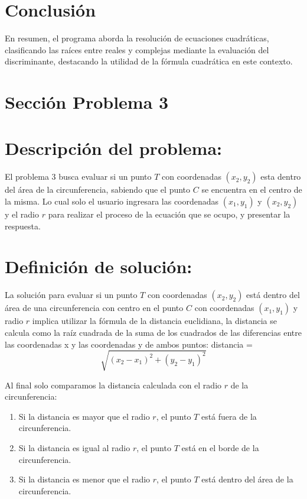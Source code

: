 \documentclass{IEEEcsmag}
\begin{document}
\section*{Conclusión}
En resumen, el programa aborda la resolución de ecuaciones cuadráticas, clasificando las raíces entre reales y complejas mediante la evaluación del discriminante, destacando la utilidad de la fórmula cuadrática en este contexto.
\newpage





\section{Sección Problema 3}

\section*{Descripción del problema:}
\begin{enumerate}
El problema 3 busca evaluar si un punto $T$ con coordenadas $(x_{2}, y_{2})$ esta dentro del área de la circunferencia, sabiendo que el punto $C$ se encuentra en el centro de la misma. Lo cual solo el usuario ingresara las coordenadas $(x_{1}, y_{1})$ y $(x_{2}, y_{2})$  y el radio $r$ para realizar el proceso de la  ecuación que se ocupo, y presentar la respuesta.
\end{enumerate}


\section*{Definición de solución:}
La solución para evaluar si un punto $T$ con coordenadas $(x_{2}, y_{2})$ está dentro del área de una circunferencia con centro en el punto $C$ con coordenadas $(x_{1}, y_{1})$ y radio $r$ implica utilizar la fórmula de la distancia euclidiana, la distancia se calcula como la raíz cuadrada de la suma de los cuadrados de las diferencias entre las coordenadas x y las coordenadas y de ambos puntos:
distancia = 
\begin{equation}
   \sqrt{ (x_2 - x_1)^2 + (y_2 - y_1)^2 }     
\end{equation}



Al final solo comparamos la distancia calculada con el radio $r$ de la circunferencia:
\begin{enumerate}
\item Si la distancia es mayor que el radio $r$, el punto $T$ está fuera de la circunferencia.
\item Si la distancia es igual al radio $r$, el punto $T$ está en el borde de la circunferencia.
\item Si la distancia es menor que el radio $r$, el punto $T$ está dentro del área de la circunferencia.    
\end{enumerate}
\end{document}
